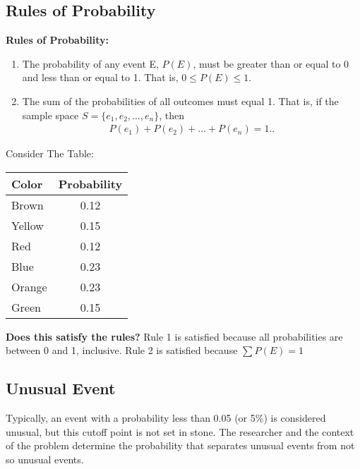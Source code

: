 \documentclass{report}
\begin{document}
    \subsection*{Rules of Probability}
    \bigbreak \noindent 
    \textbf{Rules of Probability:}
      \begin{enumerate}
        \item The probability of any event E, $P(E)$, must be greater than or equal to 0 and less than or equal to 1. That is, $0 \leq P(E) \leq 1$.
        \item The sum of the probabilities of all outcomes must equal 1. That is, if the sample space $S = \{e_1, e_2, \dots, e_n\}$, then
            \begin{align*}
                P(e_1) + P(e_2) + \dots + P(e_n) = 1.
            .\end{align*}
    \end{enumerate}
    \bigbreak \noindent 
    Consider The Table:
    \bigbreak \noindent 
        \begin{center}
              \begin{tabular}{|l|c|}
              \hline
              Color & Probability \\
              	\hline
               	 Brown  & 0.12  \\
              	\hline
              	 Yellow & 0.15 \\
              	 \hline 
              	 Red & 0.12 \\
              	 \hline
              	 Blue & 0.23 \\
              	 \hline
              	 Orange & 0.23 \\
              	 \hline
              	 Green & 0.15 \\
              	 \hline
              \end{tabular}
          \end{center}
      \bigbreak \noindent 
      \textbf{Does this satisfy the rules?}
      \bigbreak \noindent 
      Rule 1 is satisfied because all probabilities are between 0 and 1, inclusive.
      \bigbreak \noindent 
      Rule 2 is satisfied because $\sum P(E)= 1$

      \bigbreak \noindent \bigbreak \noindent 
      \subsection*{Unusual Event}
    \bigbreak \noindent 
    Typically, an event with a probability less than 0.05 (or 5\%) is considered unusual, but this cutoff point is not set in stone. The researcher and the context of the problem determine the probability that separates unusual events from not so unusual events.
    \bigbreak \noindent 
\end{document}
